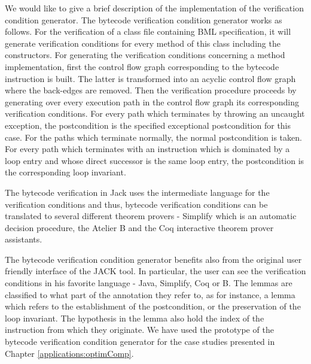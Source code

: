   We would like to give a brief description of the implementation of the verification condition generator.
The bytecode verification condition generator works as follows. For the verification of a class file containing BML specification, it will generate verification conditions for every
 method of this class including the constructors. For generating the verification conditions concerning a method implementation, first the control flow
 graph corresponding to the bytecode instruction is built. The latter is transformed into an acyclic control flow graph where the back-edges are 
removed.
 Then the verification procedure proceeds by generating over every execution path in the control flow graph its corresponding verification conditions. 
For every path which terminates by throwing an uncaught exception, the postcondition is the specified exceptional postcondition for this case. For the paths which terminate normally, 
the normal postcondition is taken. For every path which terminates with an instruction which is dominated by a loop entry and whose direct successor is the same loop entry, the postcondition 
is the corresponding loop invariant. 

The bytecode verification in Jack uses the intermediate language for the verification conditions and thus, bytecode verification conditions 
 can be translated to several different theorem provers - Simplify \cite{Simpl05DNS} which is an automatic decision procedure, 
the Atelier B and the Coq interactive theorem prover assistants. 

The bytecode verification condition generator benefits also from the original user friendly interface of the JACK tool.  In particular, 
the user can see the verification conditions in his favorite language - Java, Simplify, Coq or B. The lemmas are classified 
to what part of the annotation they refer to, as for instance, a lemma which refers to the establishment of the postcondition, or the preservation of the loop invariant.
The hypothesis in the lemma also hold the index of the instruction from which they originate. 
We have used the prototype of the bytecode verification condition generator for the case studies presented in Chapter \ref{applications:optimComp}.




